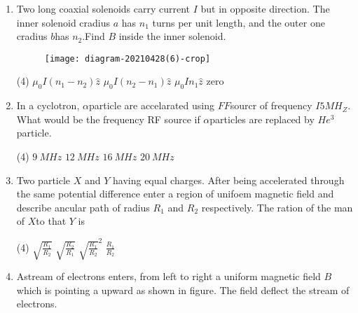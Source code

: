 \begin{enumerate}[ label=\color{ocre}\textbf{\arabic*.}]
\begin{figure}[H]
		\begin{center}
			\texttt{[image: diagram-20210428(5)-crop]}
		\end{center}
	\end{figure}
	\begin{tasks}(4)
		\task[\textbf{a.}]zero
		\task[\textbf{b.}]$\frac{\mu_{0}\sigma V}{2}$
		\task[\textbf{c.}]$\mu_{0} \sigma V$
		$\mu_{0}\sigma V$
	\end{tasks}
	\item Two long coaxial solenoids carry current $I$ but in opposite direction. The inner solenoid cradius $a$ has $n_1$ turns per unit length, and the outer one cradius $b$has $n_2$.Find $B$ inside the inner solenoid.
	\begin{figure}[H]
		\begin{center}
			\texttt{[image: diagram-20210428(6)-crop]}
		\end{center}
	\end{figure}
	\begin{tasks}(4)
		\task[\textbf{a.}]$\mu_{0}I(n_1-n_2)\hat{z}$
		\task[\textbf{b.}]$\mu_{0}I(n_2-n_1)\hat{z}$
		\task[\textbf{c.}]$\mu_{0}In_1\hat{z}$
		\task[\textbf{d.}] zero
	\end{tasks}
	\item In a cyclotron, $\alpha$particle are accelarated using $FF$sourcr of frequency $I5MH_Z$.
	What would be the frequency RF source if $\alpha$particles are replaced by $He^3$ particle.
	\begin{tasks}(4)
		\task[\textbf{a.}]$9 \ MHz$
		\task[\textbf{b.}]$12 \ MHz$
		\task[\textbf{c.}]$16\ MHz$
		\task[\textbf{d.}]$20\ MHz$
	\end{tasks}
	\item Two particle $X$ and $Y$ having equal charges. After being accelerated through the same potential difference enter a region of unifoem magnetic field and describe ancular path of radius $R_1$ and $R_2$ respectively. The ration of the man of $X$to that $Y$ is
	\begin{tasks}(4)
		\task[\textbf{a.}]$\sqrt{\frac{R_1}{R_2}}$
		\task[\textbf{b.}]$\sqrt{\frac{R_2}{R_1}}$
		\task[\textbf{c.}]$\sqrt{\frac{R_1}{R_2}}^2$
		\task[\textbf{d.}]${\frac{R_1}{R_2}}$
	\end{tasks}
	\item Astream of electrons enters, from left to right a uniform magnetic field $B$ which is pointing  a upward as shown in figure. The field deflect the stream of electrons.
	\begin{figure}[H]

\end{figure}
\end{enumerate}
